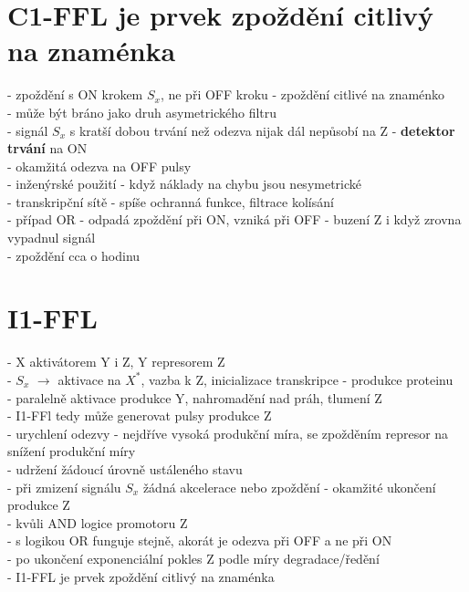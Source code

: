 \documentclass[11pt,a4paper]{report}
\begin{document}
\section{C1-FFL je prvek zpoždění citlivý na znaménka}
- zpoždění s ON krokem $S_x$, ne při OFF kroku - zpoždění citlivé na znaménko\\
- může být bráno jako druh asymetrického filtru\\
\indent - signál $S_x$ s kratší dobou trvání než odezva nijak dál nepůsobí na Z - \textbf{detektor trvání} na ON\\
\indent - okamžitá odezva na OFF pulsy\\
- inženýrské použití - když náklady na chybu jsou nesymetrické\\
- transkripční sítě - spíše ochranná funkce, filtrace kolísání\\
- případ OR - odpadá zpoždění při ON, vzniká při OFF - buzení Z i když zrovna vypadnul signál\\
\indent - zpoždění cca o hodinu\\

\section{I1-FFL}
- X aktivátorem Y i Z, Y represorem Z\\
- $S_x$ $\rightarrow$ aktivace na $X^*$, vazba k Z, inicializace transkripce - produkce proteinu\\
\indent - paralelně aktivace produkce Y, nahromadění nad práh, tlumení Z\\
- I1-FFl tedy může generovat pulsy produkce Z\\
- urychlení odezvy - nejdříve vysoká produkční míra, se zpožděním represor na snížení produkční míry\\
\indent - udržení žádoucí úrovně ustáleného stavu\\
- při zmizení signálu $S_x$ žádná akcelerace nebo zpoždění - okamžité ukončení produkce Z\\
\indent - kvůli AND logice promotoru Z\\
\indent \indent - s logikou OR funguje stejně, akorát je odezva při OFF a ne při ON\\
\indent - po ukončení exponenciální pokles Z podle míry degradace/ředění\\
\indent - I1-FFL je prvek zpoždění citlivý na znaménka\\
\end{document}
